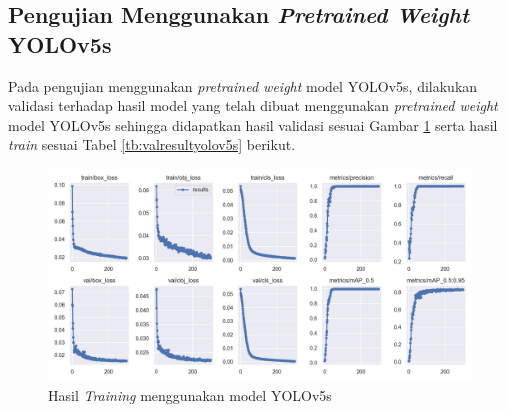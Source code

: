 \subsection{Pengujian Menggunakan \textit{Pretrained Weight} YOLOv5s}
\label{subsec:pengujianyolov5s}

Pada pengujian menggunakan \textit{pretrained weight} model YOLOv5s, dilakukan validasi terhadap hasil model yang telah dibuat menggunakan \textit{pretrained weight} model YOLOv5s sehingga didapatkan hasil validasi sesuai Gambar \ref*{fig:trainresultyolov5s} serta hasil \textit{train} sesuai Tabel \ref*{tb:valresultyolov5s} berikut. \par

\begin{figure}[H]
  \centering
  \includegraphics[scale=0.5]{gambar/yolov5s/train_results.png}
  \caption{Hasil \textit{Training} menggunakan model YOLOv5s}
  \label{fig:trainresultyolov5s}
\end{figure}

